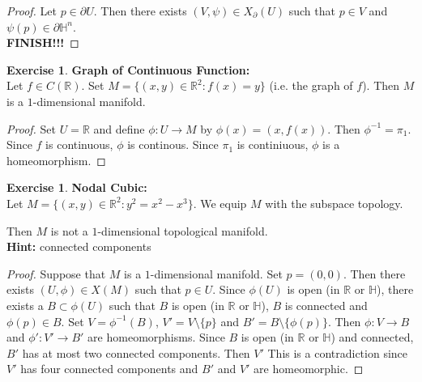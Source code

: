 \documentclass{book}
\theoremstyle{definition}
\newtheorem{ex}[definition]{Exercise}
\renewcommand{\H}{\mathbb{H}}
\newcommand{\R}{\mathbb{R}}
\DeclareMathOperator*{\0}{\mbf{0}}
\DeclareMathOperator*{\1}{\mbf{1}}
\newcommand{\tbf}[1]{\textbf{#1}}
\newcommand{\p}{\partial}
\begin{document}
	\begin{proof}
		Let $p \in \p U$. Then there exists $(V, \psi) \in X_{\p}(U)$ such that $p \in V$ and $\psi(p) \in \p \H^n$. \\
		\tbf{FINISH!!!}
	\end{proof}

	\begin{ex} \textbf{Graph of Continuous Function:} \\
		Let $f \in C(\R)$. Set $M = \{(x,y) \in \R^2: f(x) = y\}$ (i.e. the graph of $f$). Then $M$ is a $1$-dimensional manifold.  
	\end{ex}
	
	\begin{proof}
		Set $U = \R$ and define $\phi: U \rightarrow M$ by $\phi(x) = (x, f(x))$. Then $\phi^{-1} = \pi_1$. Since $f$ is continuous, $\phi$ is continous. Since $\pi_1$ is continiuous, $\phi$ is a homeomorphism.  
	\end{proof}
	
	\begin{ex} \textbf{Nodal Cubic:}\\
		Let $M = \{(x,y) \in \R^2: y^2 = x^2 - x^3\}$. We equip $M$ with the subspace topology.
		\begin{center}
		\end{center}
		Then $M$ is not a $1$-dimensional topological manifold.\\
		\textbf{Hint:} connected components
	\end{ex}

	\begin{proof}
		Suppose that $M$ is a $1$-dimensional manifold. Set $p = (0,0)$. Then there exists $(U, \phi) \in X(M)$ such that $p \in U$. Since $\phi(U)$ is open (in $\R$ or $\H$), there exists a $B \subset \phi(U)$ such that $B$ is open (in $\R$ or $\H$), $B$ is connected and $\phi(p) \in B$. Set $V = \phi^{-1}(B)$, $V' = V \setminus \{p\}$ and $B' = B \setminus \{\phi(p)\}$. Then $\phi: V \rightarrow B$ and $\phi': V' \rightarrow B'$ are homeomorphisms. Since $B$ is open (in $\R$ or $\H$) and connected, $B'$ has at most two connected components. Then $V'$ This is a contradiction since $V'$ has four connected components and $B'$ and $V'$ are homeomorphic. 
	\end{proof}
\end{document}
